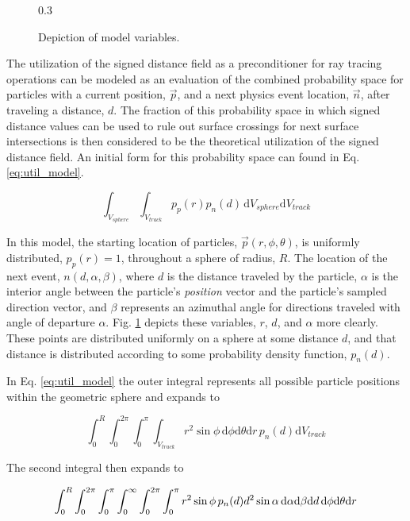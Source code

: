\begin{figure}[ht]
  \centering
  {0.3\textwidth}
  \caption{Depiction of model variables.}
  \label{fig:model}
\end{figure}

The utilization of the signed distance field as a preconditioner for ray tracing
operations can be modeled as an evaluation of the combined probability space for
particles with a current position, $\vec{p}$, and a next physics event location,
$\vec{n}$, after traveling a distance, $d$. The fraction of this probability
space in which signed distance values can be used to rule out surface crossings
for next surface intersections is then considered to be the theoretical
utilization of the signed distance field. An initial form for this probability
space can found in Eq. \ref{eq:util_model}.

\begin{equation}
  \label{eq:util_model}
\int_{V_{sphere}}\int_{V_{track}} p_p(r) p_n(d) \, \mathrm{d}V_{sphere}\mathrm{d}V_{track}
\end{equation}

In this model, the starting location of particles, $\vec{p}(r,\phi,\theta)$, is
uniformly distributed, $p_p(r)=1$, throughout a sphere of radius, $R$.  The
location of the next event, $n(d,\alpha,\beta)$, where $d$ is the distance
traveled by the particle, $\alpha$ is the interior angle between the
particle's \textit{position} vector and the particle's sampled direction
vector, and $\beta$ represents an azimuthal angle for directions traveled with
angle of departure $\alpha$. Fig. \ref{fig:model} depicts these
variables, $r$, $d$, and $\alpha$ more clearly.  These points are distributed
uniformly on a sphere at some distance $d$, and that distance is distributed
according to some probability density function, $p_n(d)$. 

In Eq. \ref{eq:util_model} the outer integral represents all possible particle positions within the
geometric sphere and expands to

\begin{equation}
\int_{0}^{R}\int_{0}^{2\pi}\int_{0}^{\pi}\int_{V_{track}} r^2\sin{\phi} \, \mathrm{d}\phi
\mathrm{d}\theta \mathrm{d}r \,  p_n(d) \mathrm{d}V_{track}
\end{equation}

The second integral then expands to

\begin{equation}
\small \int_{0}^{R}\int_{0}^{2\pi}\int_{0}^{\pi}\int_{0}^{\infty}\int_{0}^{2\pi}\int_{0}^{\pi}
r^2\sin{\phi} \, p_n(d) d^2 \sin{\alpha} \, \mathrm{d}\alpha \mathrm{d}\beta \mathrm{d}d \, \mathrm{d}\phi
\mathrm{d}\theta \mathrm{d}r
\end{equation}

